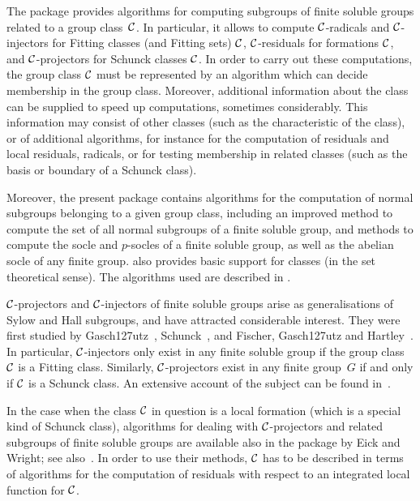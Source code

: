 
The {\GAP} package {\CRISP} provides algorithms for computing subgroups of
finite soluble groups related to a group class~$\cal C$. In particular, it
allows to compute $\cal C$-radicals and $\cal C$-injectors for
Fitting classes (and Fitting sets) $\cal C$, $\cal C$-residuals
for formations $\cal C$, and $\cal C$-projectors for Schunck
classes $\cal C$. In order to carry out these computations, the group class
$\cal C$ must be represented by an algorithm which can decide membership in
the group class. Moreover, additional information about the class can be
supplied to speed up computations, sometimes considerably. This information
may consist of other classes (such as the characteristic of the class), or of
additional algorithms, for instance for the computation of residuals and
local residuals, radicals, or for testing membership in related classes
(such as the basis or boundary of a Schunck class).

Moreover, the present package contains algorithms for the computation of
normal subgroups belonging to a given group class, including an improved
method to compute the set of all normal subgroups of a finite soluble
group, and methods to compute the socle and $p$-socles of a finite soluble group, as
well as the abelian socle of any finite group. {\CRISP} also provides basic support
for classes (in the set theoretical sense). The algorithms used are described in
\cite{Hof99}. 

$\cal C$-projectors and $\cal C$-injectors of finite soluble groups
arise as generalisations of Sylow and Hall subgroups, and have attracted
considerable interest. They were first studied
by Gasch\accent127utz~\cite{Gas63}, Schunck~\cite{Sch67}, and Fischer,
Gasch\accent127utz and Hartley~\cite{FGH67}. In particular, $\cal
C$-injectors only exist in any finite soluble group if the group class
$\cal C$ is a Fitting class. Similarly, $\cal C$-projectors exist in any
finite group~$G$ if and only if $\cal C$ is a Schunck class. An extensive
account of the subject can be found in~\cite{DH92}.

In the case when the class $\cal C$ in question is a local formation (which is
a special kind of Schunck class), algorithms for dealing with $\cal
C$-projectors and related subgroups of finite soluble groups are available
also in the {\GAP} package %
by Eick and
Wright; see also~\cite{EW99}. In order to use their methods, $\cal C$ has to
be described in terms of algorithms for the computation of residuals with
respect to an integrated local function for $\cal C$.

